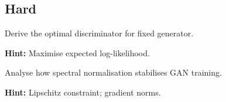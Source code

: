 \subsection*{Hard}

\begin{problem}
Derive the optimal discriminator for fixed generator.

\textbf{Hint:} Maximise expected log-likelihood.
\end{problem}

\begin{problem}
Analyse how spectral normalisation stabilises GAN training.

\textbf{Hint:} Lipschitz constraint; gradient norms.
\end{problem}

